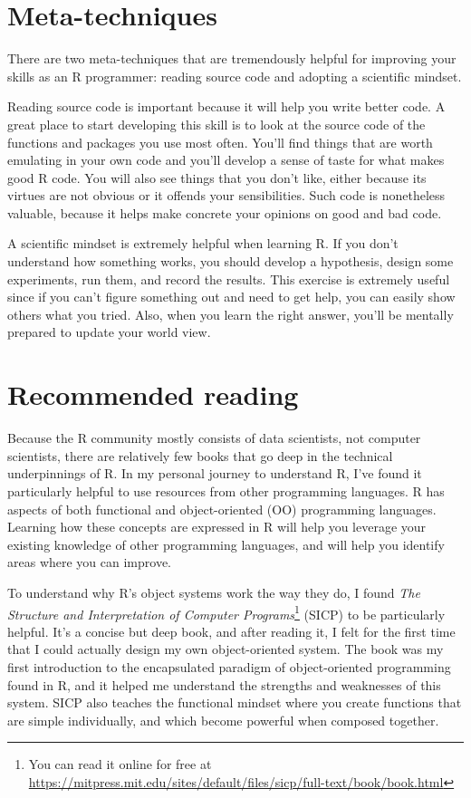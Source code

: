 \documentclass[
]{book}
\begin{document}
\hypertarget{meta-techniques}{%
\section{Meta-techniques}\label{meta-techniques}}

There are two meta-techniques that are tremendously helpful for improving your skills as an R programmer: reading source code and adopting a scientific mindset.

Reading source code is important because it will help you write better code. A great place to start developing this skill is to look at the source code of the functions and packages you use most often. You'll find things that are worth emulating in your own code and you'll develop a sense of taste for what makes good R code. You will also see things that you don't like, either because its virtues are not obvious or it offends your sensibilities. Such code is nonetheless valuable, because it helps make concrete your opinions on good and bad code.

A scientific mindset is extremely helpful when learning R. If you don't understand how something works, you should develop a hypothesis, design some experiments, run them, and record the results. This exercise is extremely useful since if you can't figure something out and need to get help, you can easily show others what you tried. Also, when you learn the right answer, you'll be mentally prepared to update your world view.

\hypertarget{recommended-reading}{%
\section{Recommended reading}\label{recommended-reading}}

Because the R community mostly consists of data scientists, not computer scientists, there are relatively few books that go deep in the technical underpinnings of R. In my personal journey to understand R, I've found it particularly helpful to use resources from other programming languages. R has aspects of both functional and object-oriented (OO) programming languages. Learning how these concepts are expressed in R will help you leverage your existing knowledge of other programming languages, and will help you identify areas where you can improve.

To understand why R's object systems work the way they do, I found \emph{The Structure and Interpretation of Computer Programs}\footnote{You can read it online for free at \url{https://mitpress.mit.edu/sites/default/files/sicp/full-text/book/book.html}} \citep{SICP} (SICP) to be particularly helpful. It's a concise but deep book, and after reading it, I felt for the first time that I could actually design my own object-oriented system. The book was my first introduction to the encapsulated paradigm of object-oriented programming found in R, and it helped me understand the strengths and weaknesses of this system. SICP also teaches the functional mindset where you create functions that are simple individually, and which become powerful when composed together.
\end{document}
